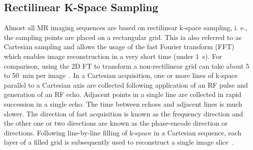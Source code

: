 \documentclass[english,version-2022-01]{uzl-thesis} %
\begin{document}
\subsection{Rectilinear K-Space Sampling}
Almost all MR imaging sequences 
are based on rectilinear k-space sampling, i. e., the sampling points 
are placed on a rectangular grid. This 
ia also referred to as Cartesian sampling and 
allows the usage of the fast Fourier transform (FFT) 
which enables 
image reconstruction in 
a very short time (under 1~s). 
For comparison, using
the 
2D FT 
to transform a non-rectilinear grid can take about
5 to 50~min per image~\cite{SamplingStrategies}.
In a Cartesian acquisition, one or more lines of k-space parallel to a Cartesian axis are collected following application of an RF pulse and generation of an RF echo. Adjacent points in a single line are collected in rapid succession in a single echo. The time between echoes and adjacent lines is much slower. The direction of fast acquisition is known as the frequency direction and the other one or two directions are known as the phase-encode direction or directions. Following line-by-line filling of k-space in a Cartesian sequence, each layer of a filled grid is subsequently used to reconstruct a single image slice~\cite{Bardo2021}.
\end{document}
